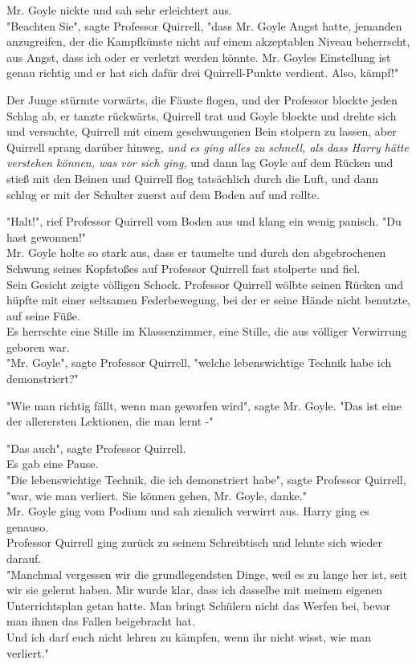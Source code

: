 {Mr. Goyle nickte und sah sehr erleichtert aus.\\ "Beachten Sie", sagte Professor Quirrell, "dass Mr. Goyle Angst hatte, jemanden anzugreifen, der die Kampfkünste nicht auf einem akzeptablen Niveau beherrscht, aus Angst, dass ich oder er verletzt werden könnte. Mr. Goyles Einstellung ist genau richtig und er hat sich dafür drei Quirrell-Punkte verdient. Also, kämpf!"

Der Junge stürmte vorwärts, die Fäuste flogen, und der Professor blockte jeden Schlag ab, er tanzte rückwärts, Quirrell trat und Goyle blockte und drehte sich und versuchte, Quirrell mit einem geschwungenen Bein stolpern zu lassen, aber Quirrell sprang darüber hinweg, \emph{und es ging alles zu schnell, als dass Harry hätte verstehen können, was vor sich ging,} und dann lag Goyle auf dem Rücken und stieß mit den Beinen und Quirrell flog tatsächlich durch die Luft, und dann schlug er mit der Schulter zuerst auf dem Boden auf und rollte.

"Halt!", rief Professor Quirrell vom Boden aus und klang ein wenig panisch. "Du hast gewonnen!"\\ Mr. Goyle holte so stark aus, dass er taumelte und durch den abgebrochenen Schwung seines Kopfstoßes auf Professor Quirrell fast stolperte und fiel.\\ Sein Gesicht zeigte völligen Schock. Professor Quirrell wölbte seinen Rücken und hüpfte mit einer seltsamen Federbewegung, bei der er seine Hände nicht benutzte, auf seine Füße.\\ Es herrschte eine Stille im Klassenzimmer, eine Stille, die aus völliger Verwirrung geboren war.\\ "Mr. Goyle", sagte Professor Quirrell, "welche lebenswichtige Technik habe ich demonstriert?"

"Wie man richtig fällt, wenn man geworfen wird", sagte Mr. Goyle. "Das ist eine der allerersten Lektionen, die man lernt -"

"Das auch", sagte Professor Quirrell.\\ Es gab eine Pause.\\ "Die lebenswichtige Technik, die ich demonstriert habe", sagte Professor Quirrell, "war, wie man verliert. Sie können gehen, Mr. Goyle, danke."\\ Mr. Goyle ging vom Podium und sah ziemlich verwirrt aus. Harry ging es genauso.\\ Professor Quirrell ging zurück zu seinem Schreibtisch und lehnte sich wieder darauf.\\ "Manchmal vergessen wir die grundlegendsten Dinge, weil es zu lange her ist, seit wir sie gelernt haben. Mir wurde klar, dass ich dasselbe mit meinem eigenen Unterrichtsplan getan hatte. Man bringt Schülern nicht das Werfen bei, bevor man ihnen das Fallen beigebracht hat.\\ Und ich darf euch nicht lehren zu kämpfen, wenn ihr nicht wisst, wie man verliert."

}
